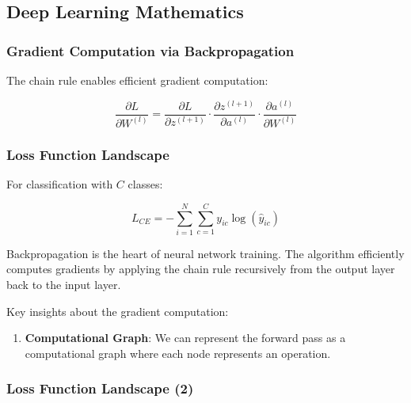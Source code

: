 \documentclass[
]{article}
\providecommand{\tightlist}{%
  \setlength{\itemsep}{0pt}\setlength{\parskip}{0pt}}
\begin{document}
\subsection{Deep Learning Mathematics}\label{deep-learning-mathematics}

\subsubsection{Gradient Computation via
Backpropagation}\label{gradient-computation-via-backpropagation}

The chain rule enables efficient gradient computation:

\[\frac{\partial L}{\partial W^{(l)}} = \frac{\partial L}{\partial z^{(l+1)}} \cdot \frac{\partial z^{(l+1)}}{\partial a^{(l)}} \cdot \frac{\partial a^{(l)}}{\partial W^{(l)}}\]

\subsubsection{Loss Function Landscape}\label{loss-function-landscape}

For classification with \(C\) classes:

\[L_{CE} = -\sum_{i=1}^{N} \sum_{c=1}^{C} y_{ic} \log(\hat{y}_{ic})\]

Backpropagation is the heart of neural network training. The algorithm
efficiently computes gradients by applying the chain rule recursively
from the output layer back to the input layer.

Key insights about the gradient computation:

\begin{enumerate}
\def\labelenumi{\arabic{enumi}.}
\tightlist
\item
  \textbf{Computational Graph}: We can represent the forward pass as a
  computational graph where each node represents an operation.
\end{enumerate}

\subsubsection{Loss Function Landscape
(2)}\label{loss-function-landscape-2}
\end{document}
